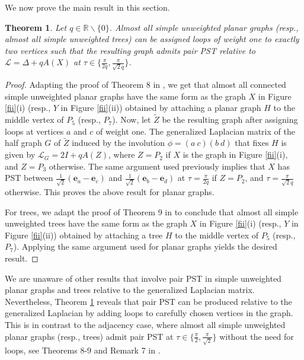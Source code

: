 \documentclass[12pt,a4paper]{article}
\newtheorem{thm}{Theorem}
\def \e {{\mathbf e}}
\newcommand{\ob}[1]{\left(#1\right)}
\begin{document}
We now prove the main result in this section.

\begin{thm}
\label{planar}
Let $q\in\mathbb{R}\backslash\{0\}$. Almost all simple unweighted planar graphs (resp., almost all simple unweighted trees) can be assigned loops of weight one to exactly two vertices such that the resulting graph admits pair PST relative to $\mathscr{L}=\Delta+qA(X)$ at $\tau\in\{\frac{\pi}{2q},\frac{\pi}{\sqrt{2}q}\}$.
\end{thm}

\begin{proof}
Adapting the proof of Theorem 8 in \cite{sarojini3}, we get that almost all connected simple unweighted planar graphs have the same form as the graph $X$ in Figure \ref{fii}(i) (resp., $Y$ in Figure \ref{fii}(ii)) obtained by attaching a planar graph $H$ to the middle vertex of $P_5$ (resp., $P_7$). Now, let $\tilde{Z}$ be the resulting graph after assigning loops at vertices $a$ and $c$ of weight one. The generalized Laplacian matrix of the half graph $G$ of $\tilde{Z}$ induced by the involution $\phi=(a~c)(b~d)$ that fixes $H$ is given by $\mathscr{L}_G=2I+q A\ob{Z}$, where $Z=P_2$ if $X$ is the graph in Figure \ref{fii}(i), and $Z=P_3$ otherwise. The same argument used previously implies that $X$ has PST between $\frac{1}{\sqrt{2}}\ob{\e_a-\e_c}$ and $\frac{1}{\sqrt{2}}\ob{\e_b-\e_d}$ at $\tau=\frac{\pi}{2q}$ if $Z=P_2$, and $\tau=\frac{\pi}{\sqrt{2}q}$ otherwise. This proves the above result for planar graphs.

For trees, we adapt the proof of Theorem 9 in \cite{sarojini3} to conclude that almost all simple unweighted trees have the same form as the graph $X$ in Figure \ref{fii}(i) (resp., $Y$ in Figure \ref{fii}(ii)) obtained by attaching a tree $H$ to the middle vertex of $P_5$ (resp., $P_7$). Applying the same argument used for planar graphs yields the desired result.
\end{proof}

We are unaware of other results that involve pair PST in simple unweighted planar graphs and trees relative to the generalized Laplacian matrix. Nevertheless, Theorem \ref{planar} reveals that pair PST can be produced relative to the generalized Laplacian by adding loops to carefully chosen vertices in the graph. This is in contrast to the adjacency case, where almost all simple unweighted planar graphs (resp., trees) admit pair PST at $\tau\in\{\frac{\pi}{2},\frac{\pi}{\sqrt{2}}\}$ without the need for loops, see Theorems 8-9 and Remark 7 in \cite{sarojini3}.
\end{document}
